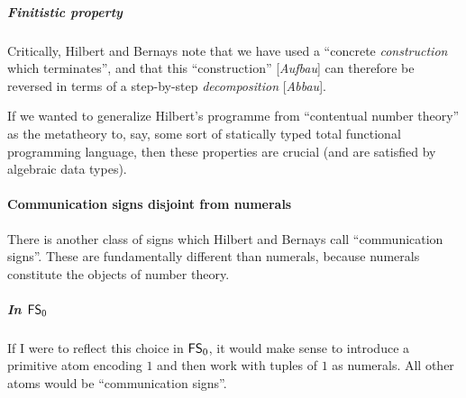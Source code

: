 \subparagraph{Finitistic property}
Critically, Hilbert and Bernays note that we have used a ``concrete
\emph{construction} which terminates'', and that this ``construction''
[\textit{Aufbau\/}] can therefore be reversed in terms of a
step-by-step \emph{decomposition} [\textit{Abbau\/}].

If we wanted to generalize Hilbert's programme from ``contentual
number theory'' as the metatheory to, say, some sort of statically
typed total functional programming language, then these properties are
crucial (and are satisfied by algebraic data types).

\paragraph{} %

\paragraph{} %

\paragraph{Communication signs disjoint from numerals} %
There is another class of signs which Hilbert and Bernays call
``communication signs''. These are fundamentally different than
numerals, because numerals constitute the objects of number theory.

\subparagraph{In $\FS0/$}
If I were to reflect this choice in $\FS0/$, it would make sense to
introduce a primitive atom encoding $1$ and then work with
tuples of $1$ as numerals. All other atoms would be ``communication signs''.

\paragraph{} %

\paragraph{} %

\paragraph{} %

\paragraph{} %

